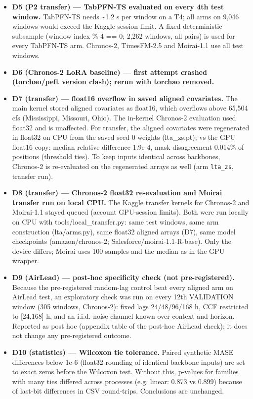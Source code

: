 \begin{itemize}
\item \textbf{D5 (P2 transfer) — TabPFN-TS evaluated on every 4th test window.} TabPFN-TS needs \textasciitilde{}1.2 s per window on a T4; all arms on 9,046 windows would exceed the Kaggle session limit. A fixed deterministic subsample (window index \% 4 == 0; 2,262 windows, all pairs) is used for every TabPFN-TS arm. Chronos-2, TimesFM-2.5 and Moirai-1.1 use all test windows.
\item \textbf{D6 (Chronos-2 LoRA baseline) — first attempt crashed (torchao/peft version clash); rerun with torchao removed.} 
\item \textbf{D7 (transfer) — float16 overflow in saved aligned covariates.} The main kernel stored aligned covariates as float16, which overflows above 65,504 cfs (Mississippi, Missouri, Ohio). The in-kernel Chronos-2 evaluation used float32 and is unaffected. For transfer, the aligned covariates were regenerated in float32 on CPU from the saved seed-0 weights (lta\_zs.pt); vs the GPU float16 copy: median relative difference 1.9e-4, mask disagreement 0.014\% of positions (threshold ties). To keep inputs identical across backbones, Chronos-2 is re-evaluated on the regenerated arrays as well (arm \texttt{lta\_zs}, transfer run).
\item \textbf{D8 (transfer) — Chronos-2 float32 re-evaluation and Moirai transfer run on local CPU.} The Kaggle transfer kernels for Chronos-2 and Moirai-1.1 stayed queued (account GPU-session limits). Both were run locally on CPU with tools/local\_transfer.py: same test windows, same arm construction (lta/arms.py), same float32 aligned arrays (D7), same model checkpoints (amazon/chronos-2; Salesforce/moirai-1.1-R-base). Only the device differs; Moirai uses 100 samples and the median as in the GPU wrapper.
\item \textbf{D9 (AirLead) — post-hoc specificity check (not pre-registered).} Because the pre-registered random-lag control beat every aligned arm on AirLead test, an exploratory check was run on every 12th VALIDATION window (305 windows, Chronos-2): fixed lags 24/48/96/168 h, CCF restricted to [24,168] h, and an i.i.d. noise channel known over context and horizon. Reported as post hoc (appendix table of the post-hoc AirLead check); it does not change any pre-registered outcome.
\item \textbf{D10 (statistics) — Wilcoxon tie tolerance.} Paired synthetic MASE differences below 1e-6 (float32 rounding of identical backbone inputs) are set to exact zeros before the Wilcoxon test. Without this, p-values for families with many ties differed across processes (e.g. linear: 0.873 vs 0.899) because of last-bit differences in CSV round-trips. Conclusions are unchanged.

\end{itemize}

